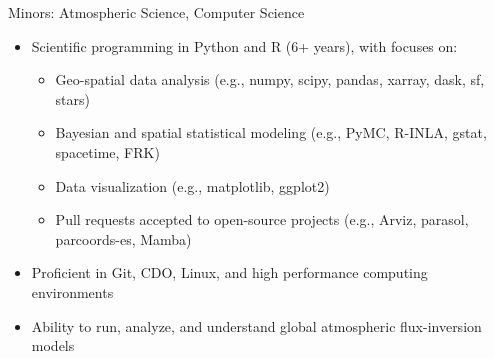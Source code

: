 \documentclass[10pt,a4paper,ragged2e,withhyper]{altacv}
\begin{document}
\begin{paracol}{2}
  
  \vspace{-0.5em}
  \divider


  \vspace{-0.5em}
  \divider

  {\small Minors: Atmospheric Science, Computer Science}

  \bigskip


  \begin{itemize}
    \item Scientific programming in Python and R (6+ years), with focuses on:
      \begin{itemize}
        \item Geo-spatial data analysis (e.g., numpy, scipy, pandas, xarray, dask, sf, stars)
        \item Bayesian and spatial statistical modeling (e.g., PyMC, R-INLA, gstat, spacetime, FRK)
        \item Data visualization (e.g., matplotlib, ggplot2)
        \item Pull requests accepted to open-source projects (e.g., Arviz, parasol, parcoords-es, Mamba)
      \end{itemize}
    \item Proficient in Git, CDO, Linux, and high performance computing environments
    \item Ability to run, analyze, and understand global atmospheric flux-inversion models
  \end{itemize}

  \vspace{-0.5em}
  \divider


\end{paracol}
\end{document}
